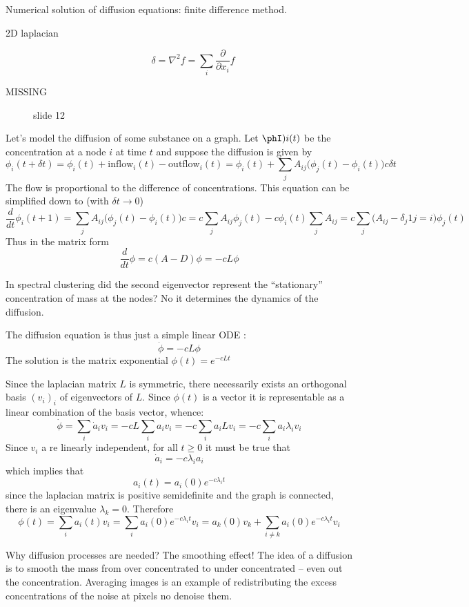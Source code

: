 \documentclass[a4paper]{article}
\begin{document}
Numerical solution of diffusion equations: finite difference method.

\begin{description}
	\item[2D laplacian] 
	\[\delta = \nabla^2 f = \sum_i \frac{\partial}{\partial x_i} f\]
	\item[MISSING] slide 12
\end{description}

Let's model the diffusion of some substance on a graph. Let $\phI)i(t)$ be the
concentration at a node $i$ at time $t$ and suppose the diffusion is given by
\[
\phi_i(t+\delta t)
= \phi_i(t) + \text{inflow}_i(t) - \text{outflow}_i(t)
= \phi_i(t) + \sum_j A_{ij} \bigl(\phi_j(t) - \phi_i(t)\bigr) c \delta t
\]
The flow is proportional to the difference of concentrations. This equation
can be simplified down to (with $\delta t \to 0$)
\[
\frac{d}{dt}\phi_i(t+1)
= \sum_j A_{ij} \bigl(\phi_j(t) - \phi_i(t)\bigr) c
= c \sum_j A_{ij} \phi_j(t) - c \phi_i(t) \sum_j A_{ij}
= c \sum_j \bigl( A_{ij} - \delta_j 1{j=i} \bigr) \phi_j(t)
\]
Thus in the matrix form
\[
\frac{d}{dt}\phi
= c (A-D) \phi
= - c L \phi
\]

In spectral clustering did the second eigenvector represent the ``stationary'' concentration of mass at the nodes? No it determines the dynamics of the diffusion.

The diffusion equation is thus just a simple linear ODE :
\[\dot{\phi} = -c L \phi\]
The solution is the matrix exponential $\phi(t) = e^{-c L t}$

Since the laplacian matrix $L$ is symmetric, there necessarily exists an
orthogonal basis $(v_i)_i$ of eigenvectors of $L$. Since $\phi(t)$ is a vector
it is representable as a linear combination of the basis vector, whence:
\[
\dot{\phi}
= \sum_i \dot{a}_i v_i
= - c L \sum_i a_i v_i
= - c \sum_i a_i L v_i
= - c \sum_i a_i \lambda_i v_i
\]
Since $v_i$ a re linearly independent, for all $t\geq0$ it must be true that
\[\dot{a}_i = - c \lambda_i a_i\]
which implies that
\[a_i(t) = a_i(0) e^{-c \lambda_i t}\]
since the laplacian matrix is positive semidefinite and the graph is connected,
there is an eigenvalue $\lambda_k=0$. Therefore
\[
\phi(t)
= \sum_i a_i(t) v_i
= \sum_i a_i(0) e^{-c \lambda_i t} v_i
= a_k(0) v_k + \sum_{i\neq k} a_i(0) e^{-c \lambda_i t} v_i
\]

Why diffusion processes are needed? The smoothing effect! The idea of a
diffusion is to smooth the mass from over concentrated to under concentrated --
even out the concentration. Averaging images is an example of redistributing
the excess concentrations of the noise at pixels no denoise them.
\end{document}
